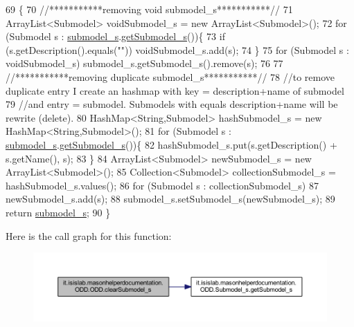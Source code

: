 \begin{DoxyCode}
69                                                 \{
70         \textcolor{comment}{//***********removing void submodel\_s***********//}
71         ArrayList<Submodel> voidSubmodel\_s = \textcolor{keyword}{new} ArrayList<Submodel>();
72         \textcolor{keywordflow}{for} (Submodel s : \hyperlink{classit_1_1isislab_1_1masonhelperdocumentation_1_1_o_d_d_1_1_o_d_d_a1da5e6dcf76e4a83ec91831f5ab98bf2}{submodel\_s}.\hyperlink{classit_1_1isislab_1_1masonhelperdocumentation_1_1_o_d_d_1_1_submodel__s_afe2141a5dacaecbbfc44a3d4d10a9d37}{getSubmodel\_s}())\{
73             \textcolor{keywordflow}{if} (s.getDescription().equals(\textcolor{stringliteral}{""}))  voidSubmodel\_s.add(s);
74         \}
75         \textcolor{keywordflow}{for} (Submodel s : voidSubmodel\_s)   submodel\_s.getSubmodel\_s().\textcolor{keyword}{remove}(s);
76         
77         \textcolor{comment}{//***********removing duplicate submodel\_s***********//}
78         \textcolor{comment}{//to remove duplicate entry I create an hashmap with key = description+name of submodel}
79         \textcolor{comment}{//and entry = submodel. Submodels with equals description+name will be rewrite (delete).}
80         HashMap<String,Submodel> hashSubmodel\_s = \textcolor{keyword}{new} HashMap<String,Submodel>();
81         \textcolor{keywordflow}{for} (Submodel s : \hyperlink{classit_1_1isislab_1_1masonhelperdocumentation_1_1_o_d_d_1_1_o_d_d_a1da5e6dcf76e4a83ec91831f5ab98bf2}{submodel\_s}.\hyperlink{classit_1_1isislab_1_1masonhelperdocumentation_1_1_o_d_d_1_1_submodel__s_afe2141a5dacaecbbfc44a3d4d10a9d37}{getSubmodel\_s}())\{
82             hashSubmodel\_s.put(s.getDescription() + s.getName(), s);
83         \}
84         ArrayList<Submodel> newSubmodel\_s = \textcolor{keyword}{new} ArrayList<Submodel>();
85         Collection<Submodel> collectionSubmodel\_s = hashSubmodel\_s.values();
86         \textcolor{keywordflow}{for} (Submodel s : collectionSubmodel\_s)
87             newSubmodel\_s.add(s);
88         submodel\_s.setSubmodel\_s(newSubmodel\_s);
89         \textcolor{keywordflow}{return} \hyperlink{classit_1_1isislab_1_1masonhelperdocumentation_1_1_o_d_d_1_1_o_d_d_a1da5e6dcf76e4a83ec91831f5ab98bf2}{submodel\_s};
90     \}
\end{DoxyCode}


Here is the call graph for this function\-:
\nopagebreak
\begin{figure}[H]
\begin{center}
\leavevmode
\includegraphics[width=350pt]{classit_1_1isislab_1_1masonhelperdocumentation_1_1_o_d_d_1_1_o_d_d_a967fd254c4e555432b7dba443855922e_cgraph}
\end{center}
\end{figure}




